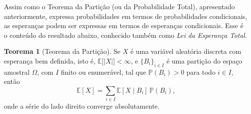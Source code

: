 \documentclass[12pt,portuguese]{article}
\theoremstyle{definition}
\newtheorem{theorem}{Teorema}
\begin{document}
Assim como o Teorema da Partição (ou da Probabilidade Total), apresentado
anteriormente, expressa probabilidades em termos de probabilidades condicionais, as esperanças podem
ser expressas em termos de esperanças condicionais. Esse é o conteúdo do
resultado abaixo, conhecido também como \emph{Lei da Esperança Total}.

\begin{theorem}[Teorema da Partição]\label{thm:particao-para-esperanca}
Se \(X\) é uma variável aleatória discreta com esperança bem definida, isto
é, \(\mathbb{E}\bigl[|X|\bigr] < \infty\), e \(\{B_i\}_{i\in I}\) é uma
partição do espaço amostral \(\Omega\), com \(I\) finito ou enumerável, tal
que \(\mathbb{P}(B_i) > 0\) para todo \(i\in I\), então
\begin{equation}\label{eq:particao}
\mathbb{E}[X]
= \sum_{i\in I} \mathbb{E}[X \mid B_i] \, \mathbb{P}(B_i),
\end{equation}
onde a série do lado direito converge absolutamente.
\end{theorem}
\end{document}
